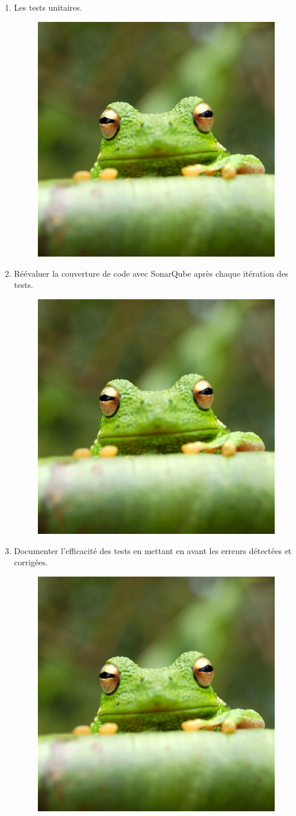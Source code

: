 \documentclass{article}
\begin{document}
\begin{enumerate}
    \item Les tests unitaires.
    \begin{figure}[H]
        \centering
        \includegraphics[width=0.5\linewidth]{assets/frog.jpg}
        \end{figure}

    \item Réévaluer la couverture de code avec SonarQube après chaque itération des tests.
    \begin{figure}[H]
        \centering
        \includegraphics[width=0.5\linewidth]{assets/frog.jpg}
        \end{figure}




    \item Documenter l’efficacité des tests en mettant en avant les erreurs détectées et corrigées.
    \begin{figure}[H]
        \centering
        \includegraphics[width=0.5\linewidth]{assets/frog.jpg}
        \end{figure}

\end{enumerate}
\end{document}
